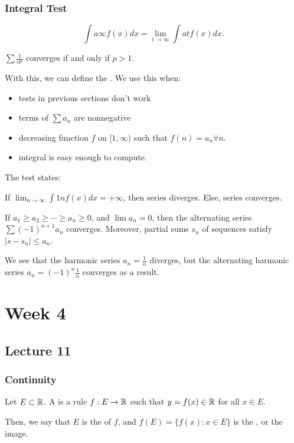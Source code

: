 \documentclass{book}
\begin{document}
\subsection{Integral Test}
\[\int{a}{\infty} f(x) dx = \lim_{t \to \infty} \int{a}{t} f(x) dx.\] 

\begin{thm}[$p$-series]
    $\sum{}{} \frac{1}{n^p}$ converges if and only if $p > 1$.
\end{thm}

With this, we can define the . We use this when:
\begin{itemize}
    \item tests in previous sections don't work
    \item terms of $\sum{}{} a_n$ are nonnegative 
    \item decreasing function $f$ on $[1, \infty)$ such that $f(n) = a_n \forall n$.
    \item integral is easy enough to compute.
\end{itemize}

The test states:

If $\lim_{n \to \infty} \int{1}{n} f(x) dx = +\infty$, then series diverges. Else, series converges.

\begin{thm}
    If $a_1 \geq a_2 \geq \cdots \geq a_n \geq 0$, and $\lim a_n = 0$, then the alternating series $\sum{}{} (-1)^{n + 1} a_n$ converges. Moreover, partial sums $s_n$ of sequences satisfy $|s - s_n| \leq a_n$.
\end{thm}

We see that the harmonic series $a_n = \frac{1}{n}$ diverges, but the alternating harmonic series $a_n = (-1)^n \frac{1}{n}$ converges as a result.

\chapter{Week 4}
\section{Lecture 11}
\subsection{Continuity}
\begin{defn}
    Let $E \subset \mathbb{R}$. A  is a rule $f : E \to \mathbb{R}$ such that $y = f(x) \in \mathbb{R}$ for all $x \in E$.

    Then, we say that $E$ is the  of $f$, and $f(E) = \{f(x) : x \in E\}$ is the , or the image.
\end{defn}
\end{document}
